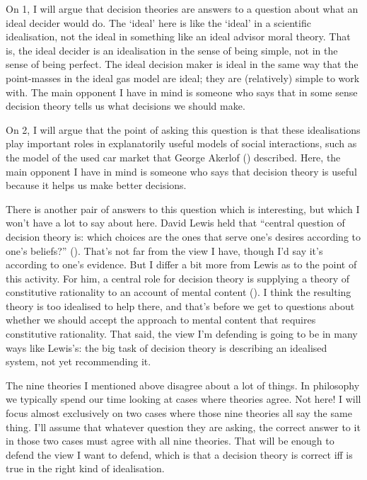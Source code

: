 \documentclass[
  11pt,
  letterpaper,
  DIV=11,
  numbers=noendperiod,
  oneside]{scrartcl}
\begin{document}
On 1, I will argue that decision theories are answers to a question
about what an ideal decider would do. The `ideal' here is like the
`ideal' in a scientific idealisation, not the ideal in something like an
ideal advisor moral theory. That is, the ideal decider is an
idealisation in the sense of being simple, not in the sense of being
perfect. The ideal decision maker is ideal in the same way that the
point-masses in the ideal gas model are ideal; they are (relatively)
simple to work with. The main opponent I have in mind is someone who
says that in some sense decision theory tells us what decisions we
should make.

On 2, I will argue that the point of asking this question is that these
idealisations play important roles in explanatorily useful models of
social interactions, such as the model of the used car market that
George Akerlof () described. Here, the
main opponent I have in mind is someone who says that decision theory is
useful because it helps us make better decisions.

There is another pair of answers to this question which is interesting,
but which I won't have a lot to say about here. David Lewis held that
``central question of decision theory is: which choices are the ones
that serve one's desires according to one's beliefs?''
(). That's not far
from the view I have, though I'd say it's according to one's evidence.
But I differ a bit more from Lewis as to the point of this activity. For
him, a central role for decision theory is supplying a theory of
constitutive rationality to an account of mental content
(). I think the resulting
theory is too idealised to help there, and that's before we get to
questions about whether we should accept the approach to mental content
that requires constitutive rationality. That said, the view I'm
defending is going to be in many ways like Lewis's: the big task of
decision theory is describing an idealised system, not yet recommending
it.

The nine theories I mentioned above disagree about a lot of things. In
philosophy we typically spend our time looking at cases where theories
agree. Not here! I will focus almost exclusively on two cases where
those nine theories all say the same thing. I'll assume that whatever
question they are asking, the correct answer to it in those two cases
must agree with all nine theories. That will be enough to defend the
view I want to defend, which is that a decision theory is correct iff is
true in the right kind of idealisation.
\end{document}
